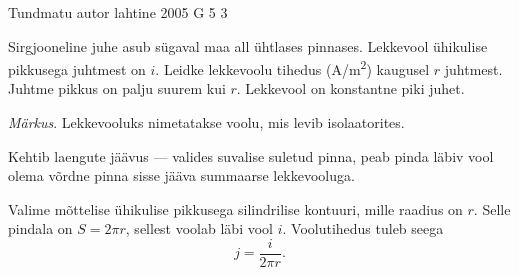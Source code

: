 {Tundmatu autor} %
{lahtine} %
{2005} %
{G 5} %
{3} %
{
\ifStatement
Sirgjooneline juhe asub sügaval maa all ühtlases pinnases. Lekkevool ühikulise pikkusega juhtmest on $i$. Leidke lekkevoolu tihedus (\si{A/m^2}) kaugusel $r$ juhtmest. Juhtme pikkus on palju suurem kui $r$. Lekkevool on konstantne piki juhet.

\emph{Märkus}. Lekkevooluks nimetatakse voolu, mis levib isolaatorites. 
\fi


\ifHint
Kehtib laengute jäävus --- valides suvalise suletud pinna, peab pinda läbiv vool olema võrdne pinna sisse jääva summaarse lekkevooluga.
\fi


\ifSolution
Valime mõttelise ühikulise pikkusega silindrilise kontuuri, mille raadius on $r$. Selle
pindala on $S = 2\pi r$, sellest voolab läbi vool $i$. Voolutihedus tuleb seega
\[
j = \frac{i}{2\pi r}.
\]
\fi
}